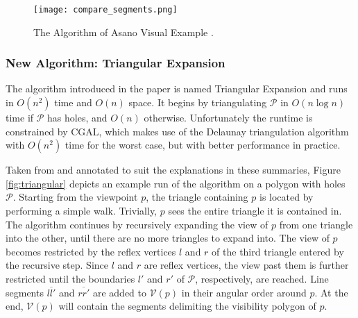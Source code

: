 \begin{figure}[h!]
	\centering
	\texttt{[image: compare\_segments.png]}
	\caption{The Algorithm of Asano \cite{asano1985efficient} Visual Example \cite{DBLP:journals/corr/BungiuHHHK14}.}
	\label{fig:asano}
\end{figure}

\subsubsection{New Algorithm: Triangular Expansion}
The algorithm introduced in the paper is named Triangular Expansion and runs in $O(n^2)$ time and $O(n)$ space. It begins by triangulating $\mathcal P$ in $O(n \log n)$ time if $\mathcal P$ has holes, and $O(n)$ otherwise. Unfortunately the runtime is constrained by CGAL, which makes use of the Delaunay triangulation algorithm \cite{delaunay1934sphere} with $O(n^2)$ time for the worst case, but with better performance in practice. 

Taken from \cite{DBLP:journals/corr/BungiuHHHK14} and annotated to suit the explanations in these summaries, Figure \ref{fig:triangular} depicts an example run of the algorithm on a polygon with holes $\mathcal P$. Starting from the viewpoint $p$, the triangle containing $p$ is located by performing a simple walk. Trivially, $p$ sees the entire triangle it is contained in. The algorithm continues by recursively expanding the view of $p$ from one triangle into the other, until there are no more triangles to expand into. The view of $p$ becomes restricted by the reflex vertices $l$ and $r$ of the third triangle entered by the recursive step. Since $l$ and $r$ are reflex vertices, the view past them is further restricted until the boundaries $l'$ and $r'$ of $\mathcal P$, respectively,  are reached. Line segments $\overline{ll'}$ and $\overline{rr'}$ are added to $\mathcal V(p)$ in their angular order around $p$. At the end, $\mathcal V(p)$ will contain the segments delimiting the visibility polygon of $p$.

